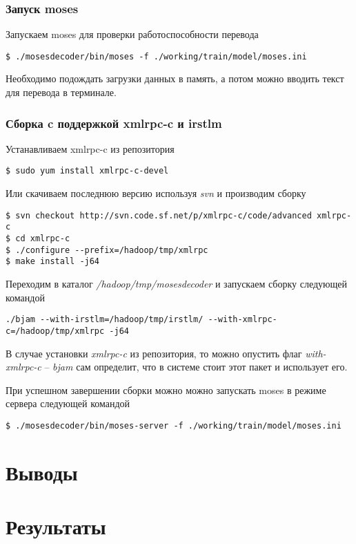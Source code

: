 \subsection{Запуск moses}
Запускаем moses для проверки работоспособности перевода
\begin{lstlisting}
$ ./mosesdecoder/bin/moses -f ./working/train/model/moses.ini
\end{lstlisting}
Необходимо подождать загрузки данных в память, а потом можно вводить текст для перевода в терминале.

\subsection{Сборка c поддержкой xmlrpc-c и irstlm}
Устанавливаем xmlrpc-c из репозитория
\begin{lstlisting}
$ sudo yum install xmlrpc-c-devel
\end{lstlisting}

Или скачиваем последнюю версию используя \emph{svn} и производим сборку
\begin{lstlisting}
$ svn checkout http://svn.code.sf.net/p/xmlrpc-c/code/advanced xmlrpc-c
$ cd xmlrpc-c
$ ./configure --prefix=/hadoop/tmp/xmlrpc
$ make install -j64
\end{lstlisting}

Переходим в каталог \emph{/hadoop/tmp/mosesdecoder} и запускаем сборку следующей командой
\begin{lstlisting}
./bjam --with-irstlm=/hadoop/tmp/irstlm/ --with-xmlrpc-c=/hadoop/tmp/xmlrpc -j64
\end{lstlisting}
В случае установки \emph{xmlrpc-c} из репозитория, то можно опустить флаг \emph{with-xmlrpc-c} -- 
\emph{bjam} сам определит, что в системе стоит этот пакет и использует его.

При успешном завершении сборки можно можно запускать moses в режиме сервера следующей командой
\begin{lstlisting}
$ ./mosesdecoder/bin/moses-server -f ./working/train/model/moses.ini
\end{lstlisting}

\chapter{Выводы}
\chapter{Результаты}

